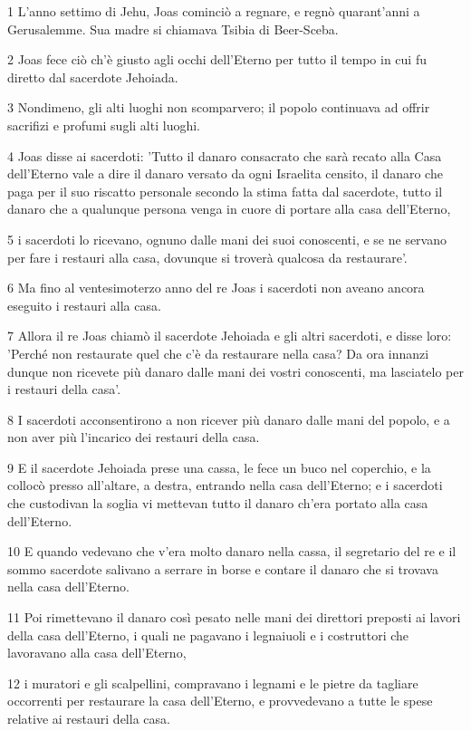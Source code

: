 \par 1 L'anno settimo di Jehu, Joas cominciò a regnare, e regnò quarant'anni a Gerusalemme. Sua madre si chiamava Tsibia di Beer-Sceba.
\par 2 Joas fece ciò ch'è giusto agli occhi dell'Eterno per tutto il tempo in cui fu diretto dal sacerdote Jehoiada.
\par 3 Nondimeno, gli alti luoghi non scomparvero; il popolo continuava ad offrir sacrifizi e profumi sugli alti luoghi.
\par 4 Joas disse ai sacerdoti: 'Tutto il danaro consacrato che sarà recato alla Casa dell'Eterno vale a dire il danaro versato da ogni Israelita censito, il danaro che paga per il suo riscatto personale secondo la stima fatta dal sacerdote, tutto il danaro che a qualunque persona venga in cuore di portare alla casa dell'Eterno,
\par 5 i sacerdoti lo ricevano, ognuno dalle mani dei suoi conoscenti, e se ne servano per fare i restauri alla casa, dovunque si troverà qualcosa da restaurare'.
\par 6 Ma fino al ventesimoterzo anno del re Joas i sacerdoti non aveano ancora eseguito i restauri alla casa.
\par 7 Allora il re Joas chiamò il sacerdote Jehoiada e gli altri sacerdoti, e disse loro: 'Perché non restaurate quel che c'è da restaurare nella casa? Da ora innanzi dunque non ricevete più danaro dalle mani dei vostri conoscenti, ma lasciatelo per i restauri della casa'.
\par 8 I sacerdoti acconsentirono a non ricever più danaro dalle mani del popolo, e a non aver più l'incarico dei restauri della casa.
\par 9 E il sacerdote Jehoiada prese una cassa, le fece un buco nel coperchio, e la collocò presso all'altare, a destra, entrando nella casa dell'Eterno; e i sacerdoti che custodivan la soglia vi mettevan tutto il danaro ch'era portato alla casa dell'Eterno.
\par 10 E quando vedevano che v'era molto danaro nella cassa, il segretario del re e il sommo sacerdote salivano a serrare in borse e contare il danaro che si trovava nella casa dell'Eterno.
\par 11 Poi rimettevano il danaro così pesato nelle mani dei direttori preposti ai lavori della casa dell'Eterno, i quali ne pagavano i legnaiuoli e i costruttori che lavoravano alla casa dell'Eterno,
\par 12 i muratori e gli scalpellini, compravano i legnami e le pietre da tagliare occorrenti per restaurare la casa dell'Eterno, e provvedevano a tutte le spese relative ai restauri della casa.
